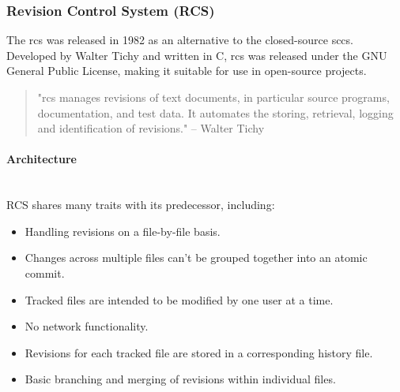 
\subsubsection{Revision Control System (RCS)}
\label{sec:rcs}
The \acrlong{rcs} was released in 1982 as an alternative to the closed-source \acrlong{sccs}. Developed by Walter Tichy and written in C, \acrshort{rcs} was released under the GNU General Public License, making it suitable for use in open-source projects.

\begin{quote}
    "\acrshort{rcs} manages revisions of text documents, in particular source programs, documentation, and test data. It automates the storing, retrieval, logging and identification of revisions." -- Walter Tichy \cite{tichy_1985}
\end{quote}

\paragraph{Architecture}
\hfill\medskip\\
RCS shares many traits with its predecessor\cite{stopak_2019}, including:
\begin{itemize}
    \item Handling revisions on a file-by-file basis.
    \item Changes across multiple files can't be grouped together into an atomic commit.
    \item Tracked files are intended to be modified by one user at a time.
    \item No network functionality.
    \item Revisions for each tracked file are stored in a corresponding history file.
    \item Basic branching and merging of revisions within individual files.
\end{itemize}

